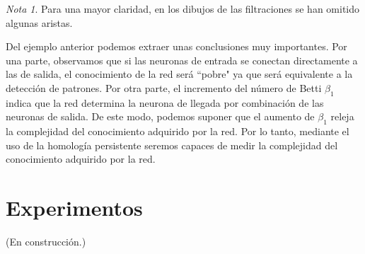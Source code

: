 \documentclass[12pt, a4paper]{article}
\numberwithin{equation}{section}
\theoremstyle{definition}
\newenvironment{ejem}
  {\pushQED{\qed}\renewcommand{\qedsymbol}{$\blacktriangleleft$}\ejemplo}
  {\popQED\endejemplo}
\theoremstyle{remark}
\newtheorem*{remark}{Nota}
\theoremstyle{plain}
\begin{document}
\begin{ejem}
\begin{figure}[H]
\begin{figure}[H]
					\end{figure}
				\endminipage
					\begin{figure}[H]
					\end{figure}
				\endminipage
			\end{figure}
			\begin{remark}
				Para una mayor claridad, en los dibujos de las filtraciones se han omitido algunas aristas.
			\end{remark}
		\end{ejem}	
		Del ejemplo anterior podemos extraer unas conclusiones muy importantes. Por una parte, observamos que si las neuronas de entrada se conectan
		directamente a las de salida, el conocimiento de la red será ``pobre" ya que será equivalente a la detección de patrones. Por otra parte,
		el incremento del número de Betti $\beta_{1}$ indica que la red determina la neurona de llegada por combinación de las neuronas de salida. De este modo,
		podemos suponer que el aumento de $\beta_{1}$ releja la complejidad del conocimiento adquirido por la red. Por lo tanto, mediante el uso de la homología persistente
		seremos capaces de medir la complejidad del conocimiento adquirido por la red.
	
	\section{Experimentos}
		(En construcción.)
\end{document}
